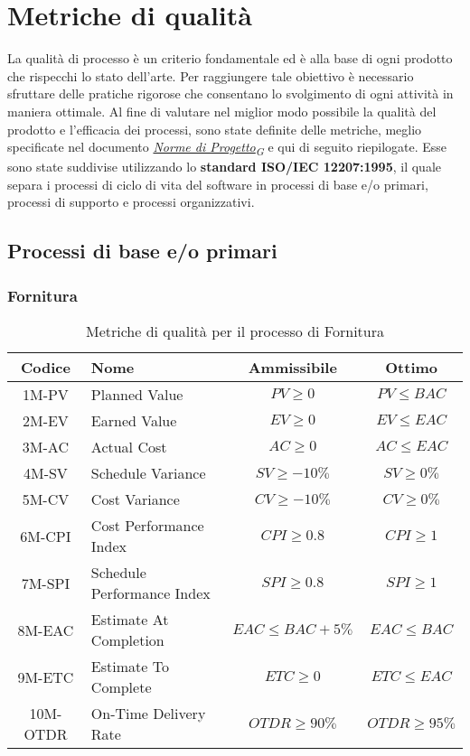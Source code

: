 \section{Metriche di qualità}
La qualità di processo è un criterio fondamentale ed è alla base di ogni prodotto che rispecchi lo stato dell'arte. Per raggiungere tale obiettivo è necessario sfruttare delle pratiche rigorose che consentano lo svolgimento di ogni attività in maniera ottimale. Al fine di valutare nel miglior modo possibile la qualità del prodotto e l'efficacia dei processi, sono state definite delle metriche, meglio specificate nel documento \href{https://7last.github.io/docs/rtb/documentazione-interna/glossario#norme-di-progetto}{\textit{Norme di Progetto\textsubscript{G}}} e qui di seguito riepilogate. Esse sono state suddivise utilizzando lo \textbf{standard ISO/IEC 12207:1995}, il quale separa i processi di ciclo di vita del software in processi di base e/o primari, processi di supporto e processi organizzativi.

\subsection{Processi di base e/o primari}
\subsubsection{Fornitura}
\begin{table}[h!]
	\centering
	\begin{tabular}{ | c | l | c | c | }
		\hline
		Codice   & Nome                       & Ammissibile          & Ottimo           \\
		\hline
		1M-PV    & Planned Value              & $PV \geq 0$          & $PV \leq BAC$    \\
		2M-EV    & Earned Value               & $EV \geq 0$          & $EV \leq EAC$    \\
		3M-AC    & Actual Cost                & $AC \geq 0$          & $AC \leq EAC$    \\
		4M-SV    & Schedule Variance          & $SV \geq -10\%$      & $SV \geq 0\%$    \\
		5M-CV    & Cost Variance              & $CV \geq -10\%$      & $CV \geq 0\%$    \\
		6M-CPI   & Cost Performance Index     & $CPI \geq 0.8$       & $CPI \geq 1$     \\
		7M-SPI   & Schedule Performance Index & $SPI \geq 0.8$       & $SPI \geq 1$     \\
		8M-EAC   & Estimate At Completion     & $EAC \leq BAC + 5\%$ & $EAC \leq BAC$   \\
		9M-ETC   & Estimate To Complete       & $ETC \geq 0$         & $ETC \leq EAC$   \\
		10M-OTDR & On-Time Delivery Rate      & $OTDR \geq 90\%$     & $OTDR \geq 95\%$ \\
		\hline
	\end{tabular}
	\caption{Metriche di qualità per il processo di Fornitura}
\end{table}

